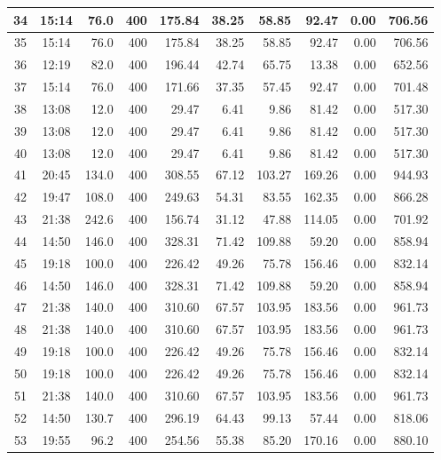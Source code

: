 \begin{landscape}
\begin{longtable}{|c|c|r|r|r|r|r|r|r|r|}
\hline
34 & 15:14 & 76.0 & 400 & 175.84 & 38.25 & 58.85 & 92.47 & 0.00 & 706.56 \\
\hline
\rowcolor{gray!8}
35 & 15:14 & 76.0 & 400 & 175.84 & 38.25 & 58.85 & 92.47 & 0.00 & 706.56 \\
\hline
36 & 12:19 & 82.0 & 400 & 196.44 & 42.74 & 65.75 & 13.38 & 0.00 & 652.56 \\
\hline
\rowcolor{gray!8}
37 & 15:14 & 76.0 & 400 & 171.66 & 37.35 & 57.45 & 92.47 & 0.00 & 701.48 \\
\hline
38 & 13:08 & 12.0 & 400 & 29.47 & 6.41 & 9.86 & 81.42 & 0.00 & 517.30 \\
\hline
\rowcolor{gray!8}
39 & 13:08 & 12.0 & 400 & 29.47 & 6.41 & 9.86 & 81.42 & 0.00 & 517.30 \\
\hline
40 & 13:08 & 12.0 & 400 & 29.47 & 6.41 & 9.86 & 81.42 & 0.00 & 517.30 \\
\hline
\rowcolor{gray!8}
41 & 20:45 & 134.0 & 400 & 308.55 & 67.12 & 103.27 & 169.26 & 0.00 & 944.93 \\
\hline
42 & 19:47 & 108.0 & 400 & 249.63 & 54.31 & 83.55 & 162.35 & 0.00 & 866.28 \\
\hline
\rowcolor{gray!8}
43 & 21:38 & 242.6 & 400 & 156.74 & 31.12 & 47.88 & 114.05 & 0.00 & 701.92 \\
\hline
44 & 14:50 & 146.0 & 400 & 328.31 & 71.42 & 109.88 & 59.20 & 0.00 & 858.94 \\
\hline
\rowcolor{gray!8}
45 & 19:18 & 100.0 & 400 & 226.42 & 49.26 & 75.78 & 156.46 & 0.00 & 832.14 \\
\hline
46 & 14:50 & 146.0 & 400 & 328.31 & 71.42 & 109.88 & 59.20 & 0.00 & 858.94 \\
\hline
\rowcolor{gray!8}
47 & 21:38 & 140.0 & 400 & 310.60 & 67.57 & 103.95 & 183.56 & 0.00 & 961.73 \\
\hline
48 & 21:38 & 140.0 & 400 & 310.60 & 67.57 & 103.95 & 183.56 & 0.00 & 961.73 \\
\hline
\rowcolor{gray!8}
49 & 19:18 & 100.0 & 400 & 226.42 & 49.26 & 75.78 & 156.46 & 0.00 & 832.14 \\
\hline
50 & 19:18 & 100.0 & 400 & 226.42 & 49.26 & 75.78 & 156.46 & 0.00 & 832.14 \\
\hline
\rowcolor{gray!8}
51 & 21:38 & 140.0 & 400 & 310.60 & 67.57 & 103.95 & 183.56 & 0.00 & 961.73 \\
\hline
52 & 14:50 & 130.7 & 400 & 296.19 & 64.43 & 99.13 & 57.44 & 0.00 & 818.06 \\
\hline
\rowcolor{gray!8}
53 & 19:55 & 96.2 & 400 & 254.56 & 55.38 & 85.20 & 170.16 & 0.00 & 880.10 \\

\end{longtable}
\end{landscape}
